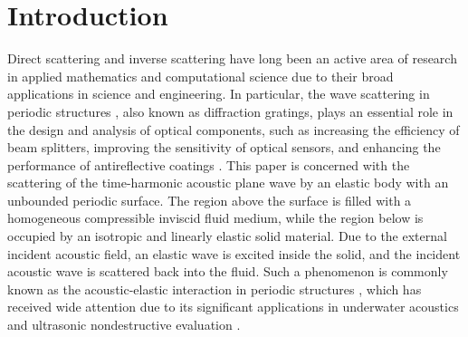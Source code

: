 \documentclass[final,3p,times]{elsarticle}
\begin{document}


\section{Introduction}
\label{sec1}
Direct scattering \cite{Bramble107, Hohage03, Jiang22, Kirsch25, LiSi25, Lin26, Lin24} and inverse scattering \cite{Gao25, Huang21, Huang25, LLN25, LLW25} have long been an active area of research in applied mathematics and computational science due to their broad applications in science and engineering. In particular, the wave scattering in periodic structures \cite{Bao21,Niu24,Wang25}, also known as diffraction gratings, plays an essential role in the design and analysis of optical components, such as increasing the efficiency of beam splitters, improving the sensitivity of optical sensors,  and enhancing the performance of antireflective coatings \cite{Bao01, Dobson93}. This paper is concerned with the scattering of the time-harmonic acoustic plane wave by an elastic body with an unbounded periodic surface. The region above the surface is filled with a homogeneous compressible inviscid fluid medium, while the region below is occupied by an isotropic and linearly elastic solid material. Due to the external incident acoustic field, an elastic wave is excited inside the solid, and the incident acoustic wave is scattered back into the fluid. Such a phenomenon is commonly known as the acoustic-elastic interaction in periodic structures \cite{Claeys83, Hu16, Lin25,WangL25}, which has received wide attention due to its significant applications in underwater acoustics and ultrasonic nondestructive evaluation \cite{Akkose, Declercq05}. 
\end{document}
